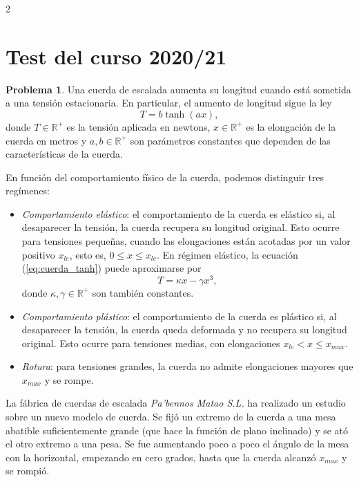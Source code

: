 
\begin{paracol}{2}
\section{Test del curso 2020/21}

\noindent \textbf{Problema 1}. Una cuerda de escalada aumenta su longitud cuando está sometida a una tensión estacionaria. En particular, el aumento de longitud sigue la ley
\begin{equation}\label{eq:cuerda_tanh}
T = b\tanh(ax),
\end{equation}
donde $T \in \mathbb{R}^+$ es la tensión aplicada en newtons, $x \in \mathbb{R}^+$ es la elongación de la cuerda en metros y $a, b \in \mathbb{R}^+$ son parámetros constantes que dependen de las características de la cuerda.

En función del comportamiento físico de la cuerda, podemos distinguir tres regímenes:

\begin{itemize}
	\item \emph{Comportamiento elástico}: el comportamiento de la cuerda es elástico si, al desaparecer la tensión, la cuerda recupera su longitud original. Esto ocurre para tensiones pequeñas, cuando las elongaciones están acotadas por un valor positivo $x_{le}$, esto es, $0 \le x \le x_{le}$. En régimen elástico, la ecuación (\ref{eq:cuerda_tanh}) puede aproximarse por
\begin{equation}\label{eq:cuerda_pol}
T = \kappa x - \gamma x^3,
\end{equation}
donde $\kappa,\gamma \in \mathbb{R}^+$ son también constantes.

\item \emph{Comportamiento plástico}: el comportamiento de la cuerda es plástico si, al desaparecer la tensión, la cuerda queda deformada y no recupera su longitud original. Esto ocurre para tensiones medias, con elongaciones $x_{le} < x \le x_{max}$.

\item \emph{Rotura}: para tensiones grandes, la cuerda no admite elongaciones mayores que $x_{max}$ y se rompe.
\end{itemize}

La fábrica de cuerdas de escalada \textit{Pa'bennos Matao S.L.} ha realizado un estudio sobre un nuevo modelo de cuerda. Se fijó un extremo de la cuerda a una mesa abatible suficientemente grande (que hace la función de plano inclinado) y se ató el otro extremo a una pesa. Se fue aumentando poco a poco el ángulo de la mesa con la horizontal, empezando en cero grados, hasta que la cuerda alcanzó $x_{max}$ y se rompió.


\end{paracol}
